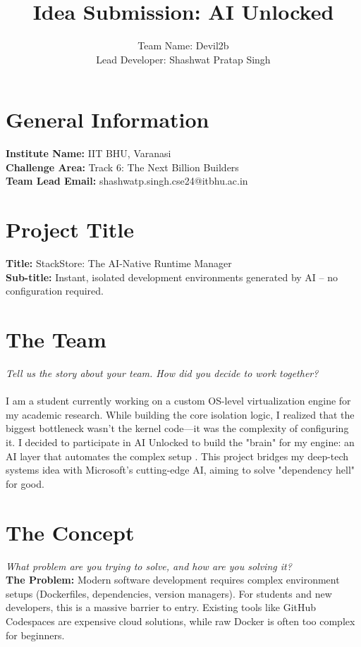 \documentclass[a4paper,12pt]{article}
\title{\textbf{Idea Submission: AI Unlocked}}
\author{Team Name: Devil2b \\ Lead Developer: Shashwat Pratap Singh}
\date{}
\begin{document}
\maketitle

\section{General Information}
\textbf{Institute Name:} IIT BHU, Varanasi \\
\textbf{Challenge Area:} Track 6: The Next Billion Builders \\
\textbf{Team Lead Email:} shashwatp.singh.cse24@itbhu.ac.in

\section{Project Title}
\textbf{Title:} StackStore: The AI-Native Runtime Manager \\
\textbf{Sub-title:} Instant, isolated development environments generated by AI -- no configuration required.

\section{The Team}
\textit{Tell us the story about your team. How did you decide to work together?} \\
\\
I am a student currently working on a custom OS-level virtualization engine for my academic research. While building the core isolation logic, I realized that the biggest bottleneck wasn't the kernel code—it was the complexity of configuring it. I decided to participate in AI Unlocked to build the "brain" for my engine: an AI layer that automates the complex setup . This project bridges my deep-tech systems idea with Microsoft's cutting-edge AI, aiming to solve "dependency hell" for good.

\section{The Concept}
\textit{What problem are you trying to solve, and how are you solving it?} \\

\textbf{The Problem:} Modern software development requires complex environment setups (Dockerfiles, dependencies, version managers). For students and new developers, this is a massive barrier to entry. Existing tools like GitHub Codespaces are expensive cloud solutions, while raw Docker is often too complex for beginners.
\end{document}
